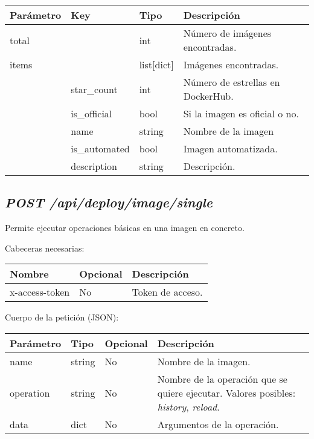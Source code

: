 				\begin{table}[!h]
					\centering
	\begin{adjustbox}{max width=\textwidth}
					\begin{tabular}{|l|l|l|l|}
						\hline
						Parámetro & Key & Tipo & Descripción \\ \hline
						total &  & int & Número de imágenes encontradas. \\ \hline
						items &  & list[dict] & Imágenes encontradas. \\ \hline
						& star\_count & int & Número de estrellas en DockerHub. \\ \hline
						& is\_official & bool & Si la imagen es oficial o no. \\ \hline
						& name & string & Nombre de la imagen \\ \hline
						& is\_automated & bool & Imagen automatizada. \\ \hline
						& description & string & Descripción. \\ \hline
					\end{tabular}
\end{adjustbox}
				\end{table}
		
	
	
	\subsection{\textit{POST /api/deploy/image/single}}
		Permite ejecutar operaciones básicas en una imagen en concreto.
		
		Cabeceras necesarias:
		\begin{table}[h!]
			\centering
	\begin{adjustbox}{max width=\textwidth}
			\begin{tabular}{|l|l|l|}
				\hline
				Nombre & Opcional & Descripción \\ \hline
				x-access-token & No & Token de acceso. \\ \hline
			\end{tabular}
\end{adjustbox}
		\end{table}
		
		Cuerpo de la petición (JSON):
		
		\begin{table}[!h]
			\centering
	\begin{adjustbox}{max width=\textwidth}
			\begin{tabular}{|l|l|l|l|}
				\hline
				Parámetro & Tipo & Opcional & Descripción \\ \hline
				name & string & No & Nombre de la imagen. \\ \hline
				operation & string & No & Nombre de la operación que se quiere ejecutar. Valores posibles: \textit{history}, \textit{reload}. \\ \hline
				data & dict & No & Argumentos de la operación. \\ \hline
			\end{tabular}
\end{adjustbox}
		\end{table}
	
